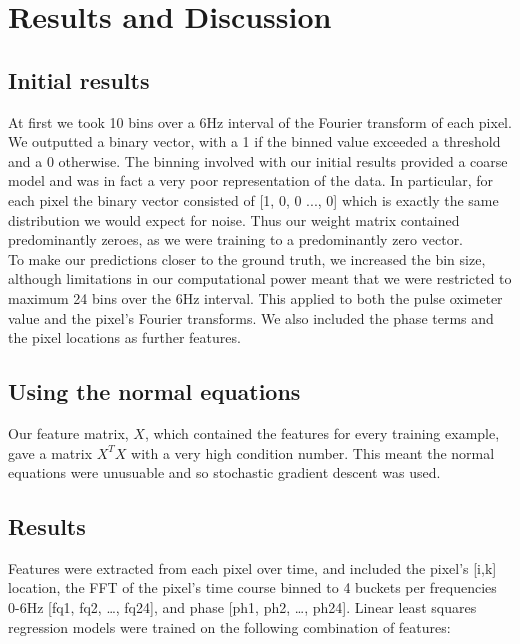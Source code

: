 \documentclass[12pt]{article}
\begin{document}
  


\section{Results and Discussion}
 \subsection*{Initial results}
  At first we took 10 bins over a 6Hz interval of the Fourier transform of each pixel. We outputted a binary vector, with a 1 if the binned value exceeded a threshold and a 0 otherwise. The binning involved with our initial results provided a coarse model and was in fact a very poor representation of the data. In particular, for each pixel the binary vector consisted of [1, 0, 0 ..., 0] which is exactly the same distribution we would expect for noise. Thus our weight matrix contained predominantly zeroes, as we were training to a predominantly zero vector. \\
  To make our predictions closer to the ground truth, we increased the bin size, although limitations in our computational power meant that we were restricted to maximum 24 bins over the 6Hz interval. This applied to both the pulse oximeter value and the pixel's Fourier transforms. We also included the phase terms and the pixel locations as further features.
  
 \subsection*{Using the normal equations}
 Our feature matrix, \(X\), which contained the features for every training example, gave a matrix $X^TX$ with a very high condition number. This meant the normal equations were unusuable and so stochastic gradient descent was used.
 
 \subsection*{Results}
 Features were extracted from each pixel over time, and included the pixel’s [i,k] location, the FFT of the pixel’s time course binned to 4 buckets per frequencies 0-6Hz [fq1, fq2, …, fq24], and phase [ph1, ph2, …, ph24]. Linear least squares regression models were trained on the following combination of features:\\
\end{document}
